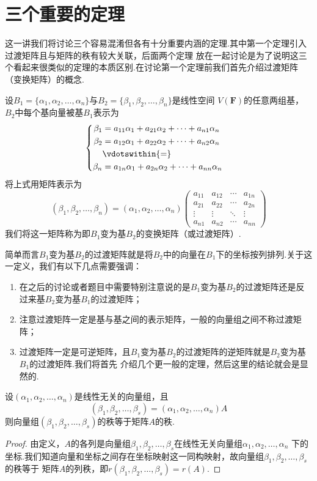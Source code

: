 \section{三个重要的定理}
这一讲我们将讨论三个容易混淆但各有十分重要内涵的定理.其中第一个定理引入过渡矩阵且与矩阵的秩有较大关联，后面两个定理
放在一起讨论是为了说明这三个看起来很类似的定理的本质区别.在讨论第一个定理前我们首先介绍过渡矩阵（变换矩阵）的概念.
\begin{definition}
    设$B_1=\{\alpha_1,\alpha_2,\ldots,\alpha_n\}$与$B_2=\{\beta_1,\beta_2,\ldots,\beta_n\}$是线性空间
    $V(\mathbf{F})$的任意两组基，$B_2$中每个基向量被基$B_1$表示为
    \[ \begin{cases} \begin{aligned}
        \beta_1 &= a_{11}\alpha_1+a_{21}\alpha_2+\cdots+a_{n1}\alpha_n \\
        \beta_2 &= a_{12}\alpha_1+a_{22}\alpha_2+\cdots+a_{n2}\alpha_n \\
        &\vdotswithin{ = } \\
        \beta_n &= a_{1n}\alpha_1+a_{2n}\alpha_2+\cdots+a_{nn}\alpha_n
    \end{aligned} \end{cases} \]
    将上式用矩阵表示为
    \[(\beta_1,\beta_2,\ldots,\beta_n)=(\alpha_1,\alpha_2,\ldots,\alpha_n)\begin{pmatrix}
        a_{11} & a_{12} & \cdots & a_{1n} \\
        a_{21} & a_{22} & \cdots & a_{2n} \\
        \vdots & \vdots & \ddots & \vdots \\
        a_{n1} & a_{n2} & \cdots & a_{nn}
    \end{pmatrix}\]
    我们将这一矩阵称为即$B_1$变为基$B_2$的变换矩阵（或过渡矩阵）.
\end{definition}
简单而言$B_1$变为基$B_2$的过渡矩阵就是将$B_2$中的向量在$B_1$下的坐标按列排列.关于这一定义，我们有以下几点需要强调：
\begin{enumerate}
    \item 在之后的讨论或者题目中需要特别注意说的是$B_1$变为基$B_2$的过渡矩阵还是反过来基$B_2$变为基$B_1$的过渡矩阵；
    \item 注意过渡矩阵一定是基与基之间的表示矩阵，一般的向量组之间不称过渡矩阵；
    \item 过渡矩阵一定是可逆矩阵，且$B_1$变为基$B_2$的过渡矩阵的逆矩阵就是$B_2$变为基$B_1$的过渡矩阵.我们将首先
    介绍几个更一般的定理，然后这里的结论就会是显然的.
\end{enumerate}
\begin{theorem}
    设$(\alpha_1,\alpha_2,\ldots,\alpha_n)$是线性无关的向量组，且
    \[(\beta_1,\beta_2,\ldots,\beta_s)=(\alpha_1,\alpha_2,\ldots,\alpha_n)A\]
    则向量组$(\beta_1,\beta_2,\ldots,\beta_s)$的秩等于矩阵$A$的秩.
\end{theorem}
\begin{proof}
    由定义，$A$的各列是向量组$\beta_1,\beta_2,\ldots,\beta_s$在线性无关向量组$\alpha_1,\alpha_2,\ldots,\alpha_n$
    下的坐标.我们知道向量和坐标之间存在坐标映射这一同构映射，故向量组$\beta_1,\beta_2,\ldots,\beta_s$的秩等于
    矩阵$A$的列秩，即$r(\beta_1,\beta_2,\ldots,\beta_s)=r(A)$.
\end{proof}

